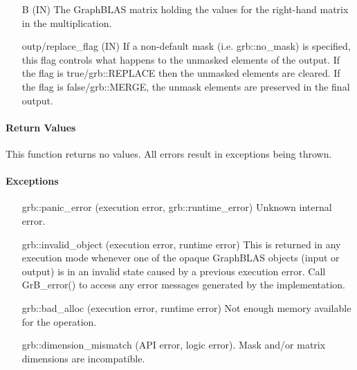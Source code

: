 \begin{itemize}[leftmargin=1.1in]
    \item[{\sf B}]    ({\sf IN}) The GraphBLAS matrix holding the values for
    the right-hand matrix in the multiplication.

    \item[{\sf outp/replace\_flag}] ({\sf IN}) If a non-default mask (i.e. {\sf grb::no\_mask}) is specified,
    this flag controls what happens to the unmasked elements of the output.  If the flag is {\sf true/grb::REPLACE}
    then the unmasked elements are cleared.  If the flag is {\sf false/grb::MERGE}, the unmask elements are preserved in the final output. \\
\end{itemize}

\paragraph{Return Values}

This function returns no values.  All errors result in exceptions being thrown.


\paragraph{Exceptions}

\begin{itemize}[leftmargin=2.1in]
    \item[{\sf grb::panic\_error}]           (execution error, grb::runtime\_error) Unknown internal error.

    \item[{\sf grb::invalid\_object}] (execution error, runtime error) This is returned in any execution mode 
    whenever one of the opaque GraphBLAS objects (input or output) is in an invalid 
    state caused by a previous execution error.  Call {\sf GrB\_error()} to access 
    any error messages generated by the implementation.

    \item[{\sf grb::bad\_alloc}] (execution error, runtime error) Not enough memory available for the operation.

    \item[{\sf grb::dimension\_mismatch}] (API error, logic error). Mask and/or matrix
    dimensions are incompatible. 
\end{itemize}

